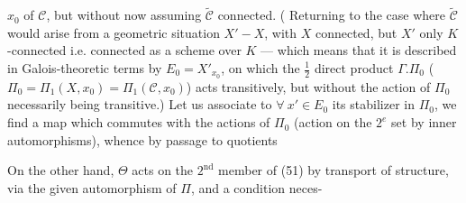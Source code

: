 $x_0$ of $\mathcal C$, but without now assuming $\widetilde{\mathcal C}$ connected. ( Returning to the case where $\widetilde{\mathcal C}$ would arise from a geometric situation $X'\mathbin{-}X$, with $X$ connected,  but $X'$ only $K$-connected i.e. connected as a scheme over $K$ --- which means that it  is described in Galois-theoretic terms by $E_0=X'_{x_0}$, on which the $\frac12$ direct product $\Gamma.\Pi_0$ ($\Pi_0=\Pi_1(X,x_0)=\Pi_1(\mathcal C,x_0)$) acts transitively, but without the action of $\Pi_0$ necessarily being transitive.) Let us associate to $\forall\ x'\in E_0$ its stabilizer in $\Pi_0$, we find a map
which commutes with the actions of $\Pi_0$ (action on the $2^e$ set by inner automorphisms), whence by passage to quotients

On the other hand, $\Theta$ acts on the $2^{\text{nd}}$ member of (51) by transport of structure, via the given automorphism of $\Pi$, and  a condition neces-
